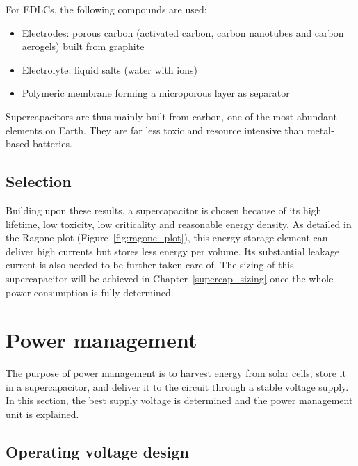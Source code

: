 \documentclass{EPL-master-thesis-covers-EN}
\begin{document}
For EDLCs, the following compounds are used:

\begin{itemize}
 \item Electrodes: porous carbon (activated carbon, carbon nanotubes and carbon aerogels) built from graphite \cite{Hastak}
 \item Electrolyte: liquid salts (water with ions)
 \item Polymeric membrane forming a microporous layer as separator
\end{itemize}

Supercapacitors are thus mainly built from carbon, one of the most abundant elements on Earth. They are far less toxic and resource intensive than metal-based batteries.

    
\section{Selection}

Building upon these results, a supercapacitor is chosen because of its high lifetime, low toxicity, low criticality and reasonable energy density. As detailed in the Ragone plot (Figure~\ref{fig:ragone_plot}), this energy storage element can deliver high currents but stores less energy per volume. Its substantial leakage current is also needed to be further taken care of. The sizing of this supercapacitor will be achieved in Chapter~\ref{supercap_sizing} once the whole power consumption is fully determined. 


\chapter{Power management}

The purpose of power management is to harvest energy from solar cells, store it in a supercapacitor, and deliver it to the circuit through a stable voltage supply. In this section, the best supply voltage is determined and the power management unit is explained.

\section{Operating voltage design}
\label{section:operating_voltage}
\end{document}
